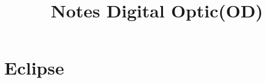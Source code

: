 \documentclass{book}
\newcommand\Course{Digital Optic}
\newcommand\CourseShortName{OD}
\begin{document}
\title{Notes \Course (\CourseShortName)}

\maketitle


\dominitoc %
\tableofcontents


\chapter{Eclipse}
\minitoc

\end{document}
